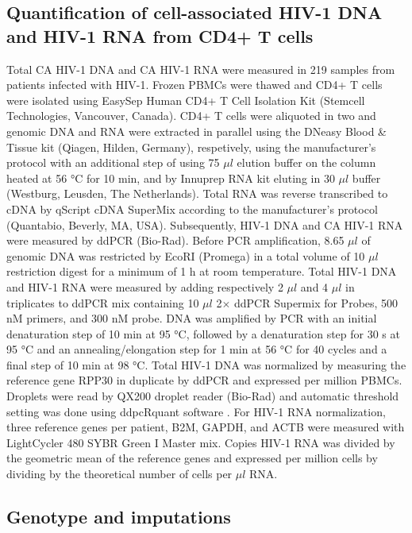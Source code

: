 \documentclass{book}
\begin{document}
\begin{refsection}
\subsection*{Quantification of cell-associated HIV-1 DNA and HIV-1 RNA from CD4+ T cells}

Total CA HIV-1 DNA and CA HIV-1 RNA were measured in 219 samples from patients infected with HIV-1.
Frozen PBMCs were thawed and CD4+ T cells were isolated using EasySep Human CD4+ T Cell Isolation Kit (Stemcell Technologies, Vancouver, Canada).
CD4+ T cells were aliquoted in two and genomic DNA and RNA were extracted in parallel using the DNeasy Blood \& Tissue kit (Qiagen, Hilden, Germany), respetively, using the manufacturer's protocol with an additional step of using 75 $\mu l$ elution buffer on the column heated at 56 °C for 10 min, and by Innuprep RNA kit eluting in 30 $\mu l$ buffer (Westburg, Leusden, The Netherlands).
Total RNA was reverse transcribed to cDNA by qScript cDNA SuperMix according to the manufacturer's protocol (Quantabio, Beverly, MA, USA).
Subsequently, HIV-1 DNA and CA HIV-1 RNA were measured by ddPCR (Bio-Rad).
Before PCR amplification, 8.65 $\mu l$ of genomic DNA was restricted by EcoRI (Promega) in a total volume of 10 $\mu l$ restriction digest for a minimum of 1 h at room temperature.
Total HIV-1 DNA and HIV-1 RNA were measured by adding respectively 2 $\mu l$ and 4 $\mu l$ in triplicates to ddPCR mix containing 10 $\mu l$ 2$\times$ ddPCR Supermix for Probes, 500 nM primers, and 300 nM probe.
DNA was amplified by PCR with an initial denaturation step of 10 min at 95 °C, followed by a denaturation step for 30 s at 95 °C and an annealing/elongation step for 1 min at 56 °C for 40 cycles and a final step of 10 min at 98 °C.
Total HIV-1 DNA was normalized by measuring the reference gene RPP30 in duplicate by ddPCR and expressed per million PBMCs.
Droplets were read by QX200 droplet reader (Bio-Rad) and automatic threshold setting was done using ddpcRquant software \cite{Trypsteen2015ddpcRquant}.
For HIV-1 RNA normalization, three reference genes per patient, B2M, GAPDH, and ACTB were measured with LightCycler 480 SYBR Green I Master mix.
Copies HIV-1 RNA was divided by the geometric mean of the reference genes and expressed per million cells by dividing by the theoretical number of cells per $\mu l$ RNA.

\subsection*{Genotype and imputations}

\end{refsection}
\end{document}
